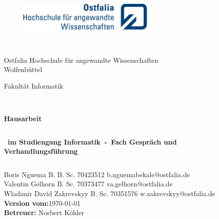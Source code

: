 \thispagestyle{empty}
\begin{figure}[t]
 \centering
 \includegraphics[width=0.6\textwidth]{pictures/ostfaliaLogo}
\end{figure}

\begin{verbatim}


\end{verbatim}

\begin{center}
\Large{Ostfalia Hochschule für angewandte Wissenschaften}\\
\Large{Wolfenbüttel}\\
\end{center}

\begin{center}
\Large{Fakultät Informatik}
\end{center}

\begin{verbatim}


\end{verbatim}

\begin{center}
\doublespacing
\textbf{\LARGE{Hausarbeit}}\\
\singlespacing
\begin{verbatim}

\end{verbatim}
\textbf{{~im Studiengang Informatik~-~Fach Gespräch und Verhandlungsführung~}}

\end{center}
\begin{verbatim}

\end{verbatim}

\begin{center}
Boris Nguema B. B. Sc. 70423512 b.nguemabekale@ostfalia.de\\
Valentin Gelhorn B. Sc. 70373477  va.gelhorn@ostfalia.de\\
Wladimir David Zakrevskyy B. Sc. 70351576 w.zakrevskyy@ostfalia.de\\
\textbf{Version vom:}\today\\
\textbf{Betreuer:} Norbert Köhler\\
\end{center}